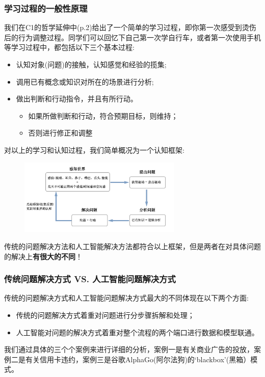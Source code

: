 \documentclass[12pt]{article}
\numberwithin{figure}{section}
\newenvironment{fullmodel}{
			\smallskip\noindent
			\begin{minipage}{\textwidth+\marginparwidth+\marginparsep}\smallskip\smallskip}
			{\smallskip\smallskip\end{minipage}\vspace{.1in}
			}
\numberwithin{equation}{section}
\begin{document}
\subsubsection{学习过程的一般性原理}

\begin{fullmodel}
	我们在C1的哲学延伸中(p.2)给出了一个简单的学习过程，即你第一次感受到烫伤后的行为调整过程。同学们可以回忆下自己第一次学自行车，或者第一次使用手机等学习过程中，都包括以下三个基本过程:
	\begin{itemize}
		\item 认知对象(问题)的接触，认知感觉和经验的揽集;
		\item 调用已有概念或知识对所在的场景进行分析;
		\item 做出判断和行动指令，并且有所行动。\begin{itemize}
		\item 如果所做判断和行动，符合预期目标，则维持；
		\item 否则进行修正和调整
		\end{itemize}
	\end{itemize}
	
对以上的学习和认知过程，我们简单概况为一个认知框架:
\begin{figure}[H]
	\centering
	\includegraphics[width=0.69\textwidth]{fig/epismeflow}
\end{figure}

传统的问题解决方法和人工智能解决方法都符合以上框架，但是两者在对具体问题的解决上\textbf{有很大的不同}！
\end{fullmodel}

\subsubsection{传统问题解决方式 VS. 人工智能问题解决方式}

传统的问题解决方式和人工智能问题解决方式最大的不同体现在以下两个方面:
	\begin{itemize}
		\item 传统的问题解决方式着重对问题进行分步骤拆解和处理；
		\item 人工智能对问题的解决方式着重对整个流程的两个端口进行数据和模型联通。
	\end{itemize}
我们通过具体的三个个案例来进行详细的分析，案例一是有关商业广告的投放，案例二是有关信用卡违约，案例三是谷歌AlphaGo(阿尔法狗)的`blackbox'(黑箱）模式。
\end{document}
